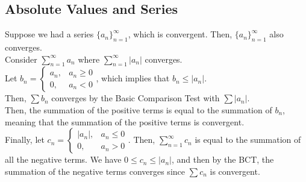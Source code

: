 \documentclass{article}
\begin{document}
\subsection{Absolute Values and Series}
Suppose we had a series $\{a_n\}_{n=1}^\infty$, which is convergent. Then, $\{a_n\}_{n=1}^\infty$ also converges.\\
Consider $\sum_{n=1}^\infty a_n$ where $\sum_{n=1}^\infty |a_n|$ converges.\\
Let $b_n = \begin{cases}
a_n, & a_n \geq 0\\
0, & a_n < 0
\end{cases}$, which implies that $b_n \leq |a_n|$.\\
Then, $\sum b_n$ converges by the Basic Comparison Test with $\sum |a_n|$.\\
Then, the summation of the positive terms is equal to the summation of $b_n$, meaning that the summation of the positive terms is convergent.\\
Finally, let $c_n = \begin{cases}|a_n|, & a_n \leq 0\\
0, & a_n > 0
\end{cases}$.
Then, $\sum_{n=1}^\infty c_n$ is equal to the summation of all the negative terms. We have $0 \leq c_n \leq |a_n|$, and then by the BCT, the summation of the negative terms converges since $\sum c_n$ is convergent.
\end{document}
